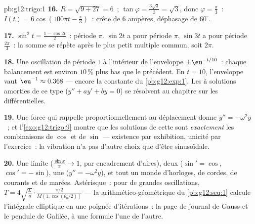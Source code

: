 \begin{solution}{pb:g12:trigo:1}
\textbf{16.} $R = \sqrt{9 + 27} = 6$~;
$\tan\varphi = \frac{3\sqrt3}{3} = \sqrt3$, donc
$\varphi = \frac\pi3$~: $I(t) = 6\cos\left(100\pi t -
\frac\pi3\right)$~: crête de $6$ ampères, déphasage de
$60^\circ$.

\textbf{17.} $\sin^2 t = \frac{1 - \cos 2t}{2}$~: période $\pi$.
$\sin 2t$ a pour période $\pi$, $\sin 3t$ a pour période
$\frac{2\pi}{3}$~: la somme se répète après le plus petit multiple
commun, soit $2\pi$.

\textbf{18.} Une oscillation de période $1$ à l'intérieur de
l'enveloppe  $\pm\eu^{-t/10}$~: chaque balancement est
environ $10\,\%$ plus bas que le précédent. En $t = 10$,
l'enveloppe vaut $\eu^{-1} \approx 0.368$ --- encore la constante
du \cref{pb:g12:exp:1}. Les  à solutions amorties de ce
type ($y'' + a y' + b y = 0$) se résolvent au chapitre sur les
 différentielles.

\textbf{19.} Une force qui rappelle proportionnellement au
déplacement donne $y'' = -\omega^2 y$~; et
l'\cref{exo:g12:trigo:9} montre que les solutions de cette 
sont \emph{exactement} les combinaisons de $\cos$ et de $\sin$ ---
existence par exhibition, unicité par l'exercice~: la vibration n'a
pas d'autre choix que d'être sinusoïdale.

\textbf{20.} Une limite ($\frac{\sin x}{x} \to 1$, par encadrement
d'aires), deux  ($\sin' = \cos$, $\cos' = -\sin$), une
 ($y'' = -\omega^2 y$), et tout un monde d'horloges, de
cordes, de courants et de marées. Astérisque~: pour de grandes
oscillations, $T = 4\sqrt{\frac Lg} \cdot
\frac{\pi/2}{M(1, \cos(\theta_0/2))}$ --- la 
arithmético-géométrique du \cref{pb:g12:seq:1} calcule l'intégrale
elliptique en une poignée d'itérations~: la page de journal de
Gauss et le pendule de Galilée, à une formule l'une de l'autre.
\end{solution}
